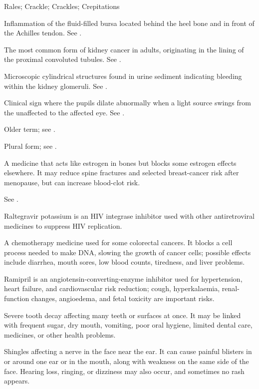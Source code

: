 \synonyms
Rales; Crackle; Crackles; Crepitations

 Inflammation of the fluid-filled bursa located behind the heel bone and in front of the Achilles tendon. See .

 The most common form of kidney cancer in adults, originating in the lining of the proximal convoluted tubules. See .

 Microscopic cylindrical structures found in urine sediment indicating bleeding within the kidney glomeruli. See .

 Clinical sign where the pupils dilate abnormally when a light source swings from the unaffected to the affected eye. See .

 Older term; see .

 Plural form; see .

 A medicine that acts like estrogen in bones but blocks some estrogen effects elsewhere. It may reduce spine fractures and selected breast-cancer risk after menopause, but can increase blood-clot risk.

 See .

 Raltegravir potassium is an HIV integrase inhibitor used with other antiretroviral medicines to suppress HIV replication.

 A chemotherapy medicine used for some colorectal cancers. It blocks a cell process needed to make DNA, slowing the growth of cancer cells; possible effects include diarrhea, mouth sores, low blood counts, tiredness, and liver problems.

 Ramipril is an angiotensin-converting-enzyme inhibitor used for hypertension, heart failure, and cardiovascular risk reduction; cough, hyperkalaemia, renal-function changes, angioedema, and fetal toxicity are important risks.

 Severe tooth decay affecting many teeth or surfaces at once. It may be linked with frequent sugar, dry mouth, vomiting, poor oral hygiene, limited dental care, medicines, or other health problems.

 Shingles affecting a nerve in the face near the ear. It can cause painful blisters in or around one ear or in the mouth, along with weakness on the same side of the face. Hearing loss, ringing, or dizziness may also occur, and sometimes no rash appears.

